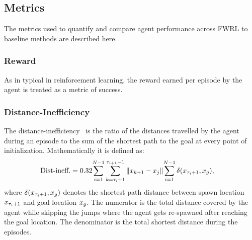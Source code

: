 \subsection{Metrics}
The metrics used to quantify and compare agent performance across
FWRL to baseline methods are described here.

\subsubsection{Reward}
As in typical in reinforcement learning, the reward earned per episode by the
agent is treated as a metric of success.



\subsubsection{Distance-Inefficiency} The distance-inefficiency~\citep{dhiman2018critical} is the ratio of the
      distances travelled by the agent during an episode to the sum of the shortest
      path to the goal at every point of initialization. Mathematically it is defined
      as:
		\begin{align}
			\text{Dist-ineff.} &=
			0.32{ \sum_{i=1}^{N-1} \sum_{k=\tau_i + 1}^{\tau_{i+1} - 1} \|x_{k+1} - x_{j}\| }
			{ \sum_{i=1}^{N-1} \delta(x_{\tau_i + 1}, x_g) } ,
		\end{align}%
		where $\delta(x_{\tau_i +1}, x_g)$ denotes the shortest path
		distance between spawn location $x_{\tau_i+1}$ and goal location
        $x_g$. The numerator is the total distance covered by the agent while
        skipping the jumps where the agent gets re-spawned after reaching the
        goal location. The denominator is the total shortest distance during the
        episodes.

